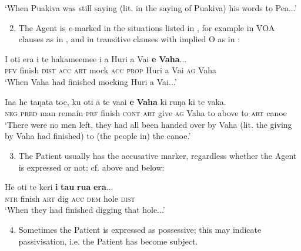 \glt
‘When Puakiva was still saying (lit. in the saying of Puakiva) his words to Pea...’ \textstyleExampleref{[R229.489]} 
\z

\begin{enumerate}
\setcounter{enumi}{1}
\item 
The Agent is \textit{e}{}-marked in the situations listed in , for example in VOA clauses as in , and in transitive clauses with implied O as in :
\end{enumerate}

\ea\label{ex:8.164}
\gll I oti era i te hakame{\ꞌ}eme{\ꞌ}e i a Huri {\ꞌ}a Vai \textbf{e} \textbf{Vaha}... \\
\textsc{pfv} finish \textsc{dist} \textsc{acc} \textsc{art} mock \textsc{acc} \textsc{prop} Huri a Vai \textsc{ag} Vaha \\

\glt 
‘When Vaha had finished mocking Huri a Vai...’ \textstyleExampleref{[R304.094]} 
\z

\ea\label{ex:8.165}
\gll {\ꞌ}Ina he taŋata toe, ku oti {\ꞌ}ā te va{\ꞌ}ai \textbf{e} \textbf{Vaha} ki ruŋa ki te vaka. \\
\textsc{neg} \textsc{pred} man remain \textsc{prf} finish \textsc{cont} \textsc{art} give \textsc{ag} Vaha to above to \textsc{art} canoe \\

\glt
‘There were no men left, they had all been handed over by Vaha (lit. the giving by Vaha had finished) to (the people in) the canoe.’ \textstyleExampleref{[Mtx-3-01.122]}
\z

\begin{enumerate}
\setcounter{enumi}{2}
\item 
The Patient usually has the accusative marker, regardless whether the Agent is expressed or not; cf.  above and  below:
\end{enumerate}
\ea\label{ex:8.166}
\gll He oti te keri \textbf{i} \textbf{tau} \textbf{rua} \textbf{era}... \\
\textsc{ntr} finish \textsc{art} dig \textsc{acc} \textsc{dem} hole \textsc{dist} \\

\glt
‘When they had finished digging that hole...’ \textstyleExampleref{[Mtx-3-02.010]}
\z

\begin{enumerate}
\setcounter{enumi}{3}
\item 
{}Sometimes the Patient is expressed as possessive; this may indicate passivisation, i.e. the Patient has become subject. 
\end{enumerate}

